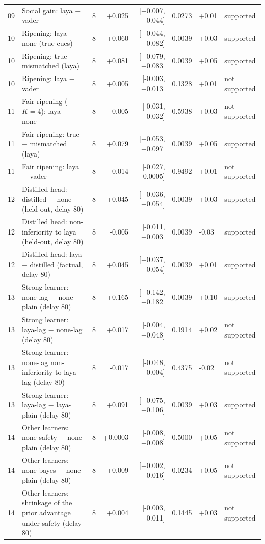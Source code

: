 \begin{table}[t]
{\begin{tabular}{@{}llrrrrll@{}}
09 & Social gain: laya $-$ vader & 8 & +0.025 & [+0.007, +0.044] & 0.0273 & +0.01 & supported \\
10 & Ripening: laya $-$ none (true cues) & 8 & +0.060 & [+0.044, +0.082] & 0.0039 & +0.03 & supported \\
10 & Ripening: true $-$ mismatched (laya) & 8 & +0.081 & [+0.079, +0.083] & 0.0039 & +0.05 & supported \\
10 & Ripening: laya $-$ vader & 8 & +0.005 & [-0.003, +0.013] & 0.1328 & +0.01 & not supported \\
11 & Fair ripening ($K{=}4$): laya $-$ none & 8 & -0.005 & [-0.031, +0.032] & 0.5938 & +0.03 & not supported \\
11 & Fair ripening: true $-$ mismatched (laya) & 8 & +0.079 & [+0.053, +0.097] & 0.0039 & +0.05 & supported \\
11 & Fair ripening: laya $-$ vader & 8 & -0.014 & [-0.027, -0.0005] & 0.9492 & +0.01 & not supported \\
12 & Distilled head: distilled $-$ none (held-out, delay 80) & 8 & +0.045 & [+0.036, +0.054] & 0.0039 & +0.03 & supported \\
12 & Distilled head: non-inferiority to laya (held-out, delay 80) & 8 & -0.005 & [-0.011, +0.003] & 0.0039 & -0.03 & supported \\
12 & Distilled head: laya $-$ distilled (factual, delay 80) & 8 & +0.045 & [+0.037, +0.054] & 0.0039 & +0.01 & supported \\
13 & Strong learner: none-lag $-$ none-plain (delay 80) & 8 & +0.165 & [+0.142, +0.182] & 0.0039 & +0.10 & supported \\
13 & Strong learner: laya-lag $-$ none-lag (delay 80) & 8 & +0.017 & [-0.004, +0.048] & 0.1914 & +0.02 & not supported \\
13 & Strong learner: none-lag non-inferiority to laya-lag (delay 80) & 8 & -0.017 & [-0.048, +0.004] & 0.4375 & -0.02 & not supported \\
13 & Strong learner: laya-lag $-$ laya-plain (delay 80) & 8 & +0.091 & [+0.075, +0.106] & 0.0039 & +0.03 & supported \\
14 & Other learners: none-safety $-$ none-plain (delay 80) & 8 & +0.0003 & [-0.008, +0.008] & 0.5000 & +0.05 & not supported \\
14 & Other learners: none-bayes $-$ none-plain (delay 80) & 8 & +0.009 & [+0.002, +0.016] & 0.0234 & +0.05 & not supported \\
14 & Other learners: shrinkage of the prior advantage under safety (delay 80) & 8 & +0.004 & [-0.003, +0.011] & 0.1445 & +0.03 & not supported \\

\end{tabular}}
\end{table}
